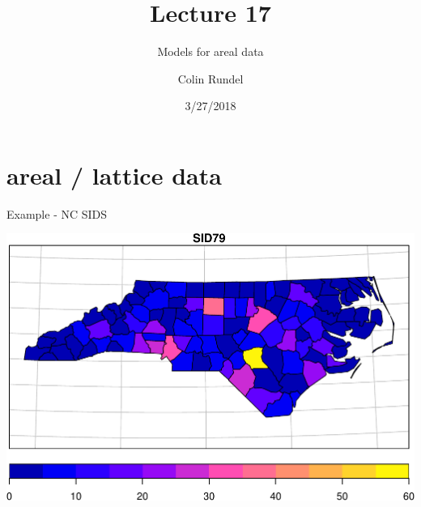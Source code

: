 \documentclass[11pt,ignorenonframetext,]{beamer}
\title{Lecture 17}
\subtitle{Models for areal data}
\author{Colin Rundel}
\date{3/27/2018}
\begin{document}
\frame{\titlepage}

\hypertarget{areal-lattice-data}{%
\section{areal / lattice data}\label{areal-lattice-data}}

\begin{frame}{Example - NC SIDS}
\protect\hypertarget{example---nc-sids}{}

\begin{center}\includegraphics[width=\textwidth]{Lec17_files/figure-beamer/unnamed-chunk-1-1} \end{center}

\end{frame}
\end{document}
